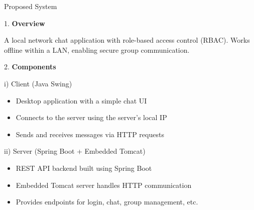 \documentclass[aspectratio=1610]{beamer}
\begin{document}
\begin{frame}{Proposed System}
\small
\vspace{0.2cm}

1. \textbf{Overview}
\vspace{0.2cm}

A local network chat application with role-based access control (RBAC). Works offline within a LAN, enabling secure group communication.
\vspace{0.2cm}

2. \textbf{Components}
\vspace{0.2cm}

i) Client (Java Swing)
\begin{itemize}
    \item Desktop application with a simple chat UI
    \item Connects to the server using the server’s local IP
    \item Sends and receives messages via HTTP requests
\end{itemize}

ii) Server (Spring Boot + Embedded Tomcat)
\begin{itemize}
    \item REST API backend built using Spring Boot
    \item Embedded Tomcat server handles HTTP communication
    \item Provides endpoints for login, chat, group management, etc.
\end{itemize}

\end{frame}
\end{document}
